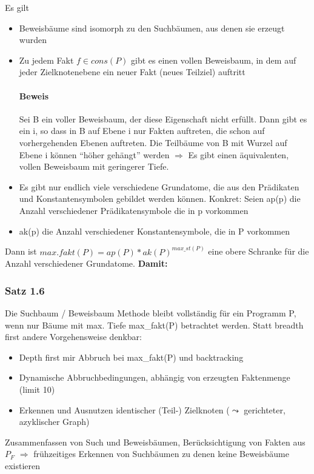 \documentclass[12pt, a4paper]{article}
\begin{document}
Es gilt
\begin{itemize}
\item Beweisbäume sind isomorph zu den Suchbäumen, aus denen sie erzeugt wurden
\item Zu jedem Fakt $f \in cons(P)$ gibt es einen vollen Beweisbaum, in dem auf jeder Zielknotenebene ein neuer Fakt (neues Teilziel) auftritt
\paragraph{Beweis}
Sei B ein voller Beweisbaum, der diese Eigenschaft nicht erfüllt.
Dann gibt es ein i, so dass in B auf Ebene i nur Fakten auftreten, die schon auf vorhergehenden Ebenen auftreten. Die Teilbäume von B mit Wurzel auf Ebene i können ``höher gehängt'' werden $\Rightarrow$ Es gibt einen äquivalenten, vollen Beweisbaum mit geringerer Tiefe.

\item Es gibt nur endlich viele verschiedene Grundatome, die aus den Prädikaten und Konstantensymbolen gebildet werden können. Konkret: Seien ap(p) die Anzahl verschiedener Prädikatensymbole die in p vorkommen
\item ak(p) die Anzahl verschiedener Konstantensymbole, die in P vorkommen
\end{itemize}

Dann ist $max. fakt(P) = ap(P) * ak(P)^{max\_st(P)}$ eine obere Schranke für die Anzahl verschiedener Grundatome. \textbf{Damit:}
    
\subsubsection*{Satz 1.6} Die Suchbaum / Beweisbaum Methode bleibt vollständig für ein Programm P, wenn nur Bäume mit max. Tiefe max\_fakt(P) betrachtet werden.
Statt breadth first andere Vorgehensweise denkbar:

\begin{itemize}
    \item Depth first mir Abbruch bei max\_fakt(P) und backtracking
    \item Dynamische Abbruchbedingungen, abhängig von erzeugten Faktenmenge (limit 10)
    \item Erkennen und Ausnutzen identischer (Teil-) Zielknoten ($\leadsto$ gerichteter, azyklischer Graph)
\end{itemize}

Zusammenfassen von Such und Beweisbäumen, Berücksichtigung von Fakten aus $P_F$ $\Rightarrow$ frühzeitiges Erkennen von Suchbäumen zu denen keine Beweisbäume existieren
\end{document}
